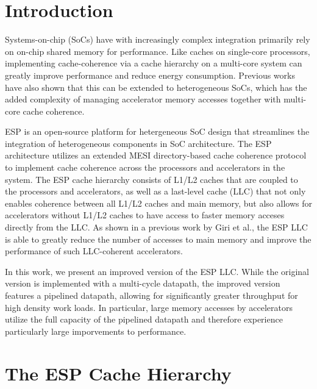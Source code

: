 \documentclass{sig-alternate}
\begin{document}
\section{Introduction}
\label{sec:intro}

Systems-on-chip (SoCs) have with increasingly complex integration primarily rely on on-chip shared memory for performance. Like caches on single-core processors,
implementing cache-coherence via a cache hierarchy on a multi-core system can greatly improve performance and reduce energy consumption. Previous works have also shown that this can be
extended to heterogeneous SoCs, which has the added complexity of managing accelerator memory accesses together with multi-core cache coherence.
\par ESP is an open-source platform for hetergeneous SoC design that streamlines the integration of heterogeneous components in SoC architecture.
The ESP architecture utilizes an extended MESI directory-based cache coherence protocol to implement cache coherence across the processors and accelerators in the system. The ESP cache hierarchy consists of L1/L2 caches that are coupled
to the processors and accelerators, as well as a last-level cache (LLC) that not only enables coherence between all L1/L2 caches and main memory, but also allows for accelerators without L1/L2 caches to have access to
faster memory acceses directly from the LLC. As shown in a previous work by Giri et al., the ESP LLC is able to greatly reduce the number of accesses to main memory and improve the performance of such LLC-coherent accelerators.
\par In this work, we present an improved version of the ESP LLC. While the original version is implemented with a multi-cycle datapath, the improved version features a pipelined datapath, 
allowing for significantly greater throughput for high density work loads. In particular, large memory accesses by accelerators utilize the full capacity of the pipelined datapath and therefore experience particularly large imporvements 
to performance.

\section{The ESP Cache Hierarchy}
\label{sec:cache}
\end{document}
